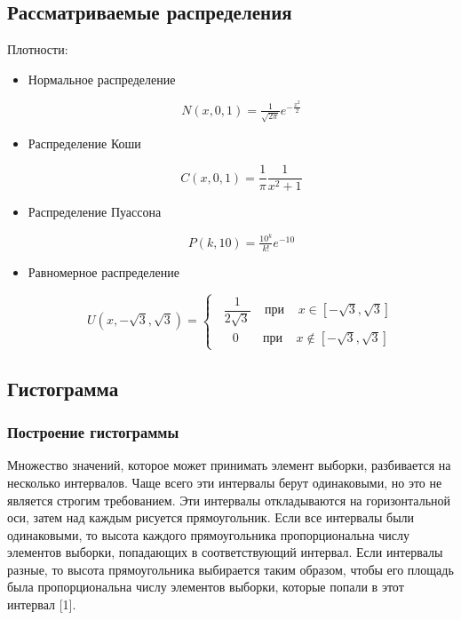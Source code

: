 \documentclass{article}
\begin{document}
\subsection{Рассматриваемые распределения}
Плотности:
\begin{itemize}
  \item Нормальное распределение
  
  \begin{equation}
      N(x, 0, 1) = \tfrac{1}{\sqrt{2\pi}}e^{-\tfrac{x^2}{2}}
  \end{equation}
  
  \item Распределение Коши
  
   \begin{equation}
      C(x, 0, 1) = \dfrac{1}{\pi}\dfrac{1}{x^2+1}
  \end{equation}
  
  \item Распределение Пуассона
  
  \begin{equation}
      P(k, 10) = \tfrac{10^k}{k!}e^{-10}
  \end{equation}
  
  \item Равномерное распределение
  
    \begin{equation}
      U(x, -\sqrt{3}, \sqrt{3}) =
        \begin{cases} 
            \;\; \dfrac{1}{2\sqrt{3}} \;\;\;\; \text{при} \;\;\;\; x \in [-\sqrt{3}, \sqrt{3}]\\
            \,\,\,\:\;\; 0 \;\;\;\;\;\;\; \text{при} \;\;\;\; x \not\in [-\sqrt{3}, \sqrt{3}]
        \end{cases}
  \end{equation}
  
\end{itemize}

\subsection{Гистограмма}

\subsubsection{Построение гистограммы}
Множество значений, которое может принимать элемент выборки, разбивается на несколько интервалов. Чаще всего эти интервалы берут одинаковыми, но это не является строгим требованием. Эти интервалы откладываются
на горизонтальной оси, затем над каждым рисуется прямоугольник. Если
все интервалы были одинаковыми, то высота каждого прямоугольника пропорциональна числу элементов выборки, попадающих в соответствующий
интервал. Если интервалы разные, то высота прямоугольника выбирается
таким образом, чтобы его площадь была пропорциональна числу элементов
выборки, которые попали в этот интервал [1].
\end{document}
